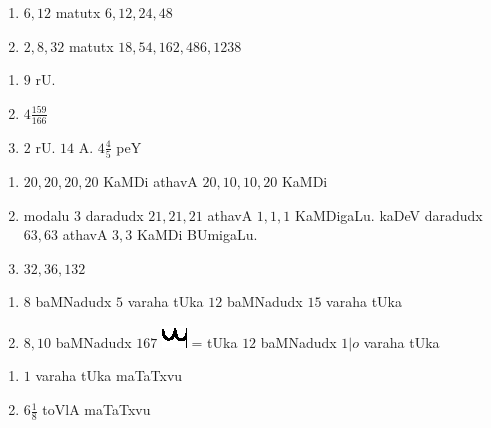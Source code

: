 
\begin{multicols}{2}
\begin{enumerate}[$(1)$]
\item $6, 12$ matutx $6, 12, 24, 48$
\item $2, 8, 32$ matutx $18, 54, 162, 486, 1238$ 
\end{enumerate}
\end{multicols}


\begin{multicols}{3}
\begin{enumerate}[$(1)$]
\item $9$ rU.
\item $4 \frac{159}{166}$
\item $2$ rU. $14$ A. $4 \frac{4}{5}$ peY
\end{enumerate}
\end{multicols}


\begin{enumerate}[$(1)$]
\item $20, 20, 20, 20$ KaMDi athavA $20, 10, 10, 20$ KaMDi
\item modalu $3$ daradudx $21, 21, 21$ athavA $1, 1, 1$
KaMDigaLu. kaDeV daradudx $63, 63$ athavA $3, 3$ KaMDi BUmigaLu.
\item $32, 36, 132$
\end{enumerate}


\begin{enumerate}[$(1)$]
\item $8$ baMNadudx $5$ varaha tUka $12$ baMNadudx $15$ varaha tUka
\item $8, 10$ baMNadudx $167$ \includegraphics{images/mu.eps} = tUka
$12$ baMNadudx $1|o$ varaha tUka
\end{enumerate}


\begin{multicols}{2}
\begin{enumerate}[$(1)$]
\item $1$ varaha tUka maTaTxvu
\item $6\frac{1}{8}$ toVlA maTaTxvu
\end{enumerate}
\end{multicols}

